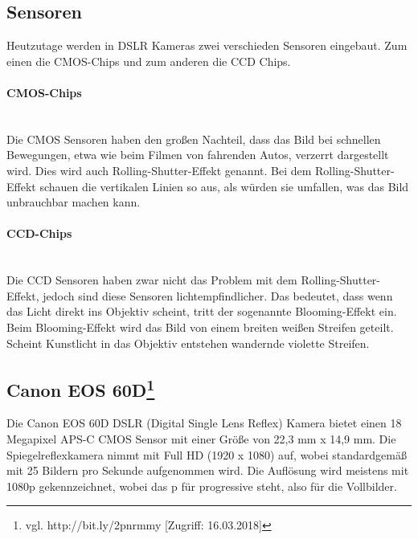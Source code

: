 \subsection{Sensoren}
Heutzutage werden in DSLR Kameras zwei verschieden Sensoren eingebaut. Zum einen die CMOS-Chips und zum anderen die CCD Chips.
\paragraph{CMOS-Chips}
\leavevmode \\
Die CMOS Sensoren haben den großen Nachteil, dass das Bild bei schnellen Bewegungen, etwa wie beim Filmen von fahrenden Autos, verzerrt dargestellt wird. Dies wird auch Rolling-Shutter-Effekt genannt. Bei dem Rolling-Shutter-Effekt schauen die vertikalen Linien so aus, als würden sie umfallen, was das Bild unbrauchbar machen kann.
\paragraph{CCD-Chips}
\leavevmode \\
Die CCD Sensoren haben zwar nicht das Problem mit dem Rolling-Shutter-Effekt, jedoch sind diese Sensoren lichtempfindlicher. Das bedeutet, dass wenn das Licht direkt ins Objektiv scheint, tritt der sogenannte Blooming-Effekt ein. Beim Blooming-Effekt wird das Bild von einem breiten weißen Streifen geteilt. Scheint Kunstlicht in das Objektiv entstehen wandernde violette Streifen.
\subsection[Canon EOS 60D]{Canon EOS 60D\protect\footnote{\label{}vgl. http://bit.ly/2pnrmmy [Zugriff: 16.03.2018]}} Die Canon EOS 60D DSLR (Digital Single Lens Reflex) Kamera bietet einen 18 Megapixel APS-C CMOS Sensor mit einer Größe von 22,3 mm x 14,9 mm. Die Spiegelreflexkamera nimmt mit Full HD (1920 x 1080) auf, wobei standardgemäß mit 25 Bildern pro Sekunde aufgenommen wird. Die Auflösung wird meistens mit 1080p gekennzeichnet, wobei das p für progressive steht, also für die Vollbilder.
